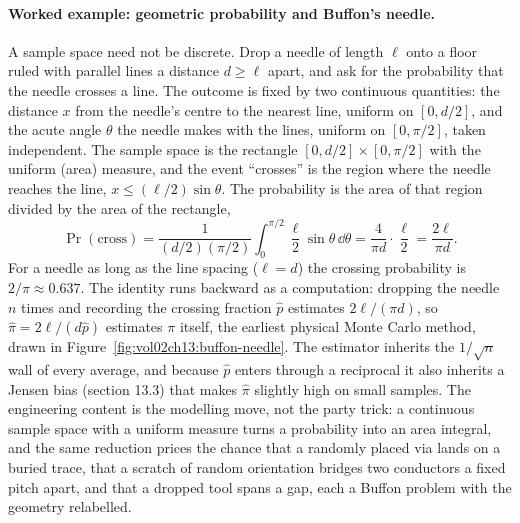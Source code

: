 \paragraph{Worked example: geometric probability and Buffon's needle.}
A sample space need not be discrete. Drop a needle of length $\ell$ onto
a floor ruled with parallel lines a distance $d \geq \ell$ apart, and ask
for the probability that the needle crosses a line. The outcome is fixed
by two continuous quantities: the distance $x$ from the needle's centre
to the nearest line, uniform on $[0, d/2]$, and the acute angle $\theta$
the needle makes with the lines, uniform on $[0, \pi/2]$, taken
independent. The sample space is the rectangle $[0, d/2] \times [0,
\pi/2]$ with the uniform (area) measure, and the event ``crosses'' is the
region where the needle reaches the line, $x \leq (\ell/2)\sin\theta$.
The probability is the area of that region divided by the area of the
rectangle,
\[
\Pr(\text{cross}) =
\frac{1}{(d/2)(\pi/2)}
\int_{0}^{\pi/2} \frac{\ell}{2}\sin\theta \,\dd\theta
= \frac{4}{\pi d}\cdot\frac{\ell}{2}
= \frac{2\ell}{\pi d}.
\]
For a needle as long as the line spacing ($\ell = d$) the crossing
probability is $2/\pi \approx 0.637$. The identity runs backward as a
computation: dropping the needle $n$ times and recording the crossing
fraction $\hat p$ estimates $2\ell/(\pi d)$, so $\hat\pi = 2\ell/(d\hat
p)$ estimates $\pi$ itself, the earliest physical Monte Carlo method,
drawn in Figure~\ref{fig:vol02ch13:buffon-needle}. The estimator inherits
the $1/\sqrt{n}$ wall of every average, and because $\hat p$ enters
through a reciprocal it also inherits a Jensen bias (section 13.3) that
makes $\hat\pi$ slightly high on small samples. The engineering content
is the modelling move, not the party trick: a continuous sample space
with a uniform measure turns a probability into an area integral, and the
same reduction prices the chance that a randomly placed via lands on a
buried trace, that a scratch of random orientation bridges two conductors
a fixed pitch apart, and that a dropped tool spans a gap, each a
Buffon problem with the geometry relabelled.




